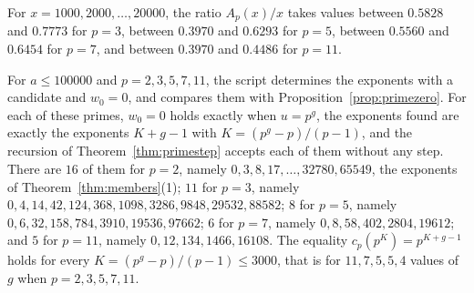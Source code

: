 \documentclass[11pt]{amsart}
\theoremstyle{definition}
\begin{document}
For $x=1000,2000,\dots,20000$, the ratio $A_p(x)/x$ takes values between $0.5828$ and $0.7773$ for $p=3$, between $0.3970$ and $0.6293$ for $p=5$, between $0.5560$ and $0.6454$ for $p=7$, and between $0.3970$ and $0.4486$ for $p=11$.

For $a\le100000$ and $p=2,3,5,7,11$, the script determines the exponents with a candidate and $w_0=0$, and compares them with Proposition~\ref{prop:primezero}. For each of these primes, $w_0=0$ holds exactly when $u=p^g$, the exponents found are exactly the exponents $K+g-1$ with $K=(p^g-p)/(p-1)$, and the recursion of Theorem~\ref{thm:primestep} accepts each of them without any step. There are $16$ of them for $p=2$, namely $0,3,8,17,\dots,32780,65549$, the exponents of Theorem~\ref{thm:members}(1); $11$ for $p=3$, namely $0,4,14,42,124,368,1098,3286,9848,29532,88582$; $8$ for $p=5$, namely $0,6,32,158,784,3910,19536,97662$; $6$ for $p=7$, namely $0,8,58,402,2804,19612$; and $5$ for $p=11$, namely $0,12,134,1466,16108$. The equality $c_p(p^K)=p^{K+g-1}$ holds for every $K=(p^g-p)/(p-1)\le3000$, that is for $11,7,5,5,4$ values of $g$ when $p=2,3,5,7,11$.
\end{document}
